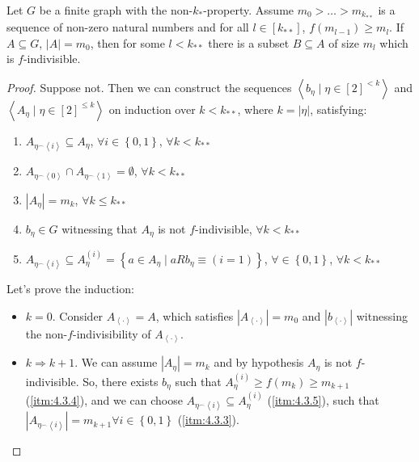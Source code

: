     \lemma[Claim 4.3]\label{existance_of_indivisible_sets}
    Let $G$ be a finite graph with the non-$k_*$-property.
    Assume $m_0 > \dots > m_{k_{**}}$ is a sequence of non-zero natural numbers and for all $l \in [k_{**}]$, $f(m_{l-1}) \geq m_l$.
    If $A \subseteq G$, $|A| = m_0$, then for some $l < k_{**}$ there is a subset $B \subseteq A$ of size $m_l$ which is
        $f$-indivisible.
        \begin{proof}
        Suppose not.
        Then we can construct the sequences $\left< b_\eta \mid \eta \in [2]^{<k} \right>$ and $\left< A_\eta \mid \eta \in [2]^{\leq k} \right>$
            on induction over $k < k_{**}$, where $k = |\eta|$, satisfying:
        \begin{enumerate}
            \item\label{itm:4.3.1} $A_{\eta^\frown \left< i \right>} \subseteq A_{\eta}$, $\forall i \in \left\{0,1\right\}$, $\forall k < k_{**}$
            \item\label{itm:4.3.2} $A_{\eta^\frown \left< 0 \right>} \cap A_{\eta^\frown \left< 1 \right>} = \emptyset$, $\forall k < k_{**}$
            \item\label{itm:4.3.3} $|A_\eta| = m_k$, $\forall k \leq k_{**}$
            \item\label{itm:4.3.4} $b_\eta \in G$ witnessing that $A_\eta$ is not $f$-indivisible, $\forall k < k_{**}$
            \item\label{itm:4.3.5} $A_{\eta^\frown \left< i \right>} \subseteq A_\eta^{(i)} = \left\{ a \in A_\eta \mid a R b_\eta \equiv (i=1) \right\}$,
                $\forall \in \left\{ 0,1 \right\}$, $\forall k < k_{**}$
        \end{enumerate}
        Let's prove the induction:
        \begin{itemize}
            \item \underline{$k=0$}.
                Consider $A_{\left< \cdot \right>} = A$, which satisfies $|A_{\left< \cdot \right>}| = m_0$ and
                $|b_{\left< \cdot \right>}|$ witnessing the non-$f$-indivisibility of $A_{\left< \cdot \right>}$.
            \item \underline{$k \Rightarrow k+1$}.
                We can assume $|A_\eta| = m_k$ and by hypothesis $A_\eta$ is not $f$-indivisible.
                So, there exists $b_\eta$ such that $A_\eta^{(i)} \geq f(m_k) \geq m_{k+1}$ (\ref{itm:4.3.4}), and we can choose
                    $A_{\eta^\frown \left< i \right>} \subseteq A_\eta^{(i)}$ (\ref{itm:4.3.5}), such that
                    $|A_{\eta^\frown \left< i \right>}| = m_{k+1} \forall i \in \left\{ 0,1 \right\}$ (\ref{itm:4.3.3}).

\end{itemize}
\end{proof}
